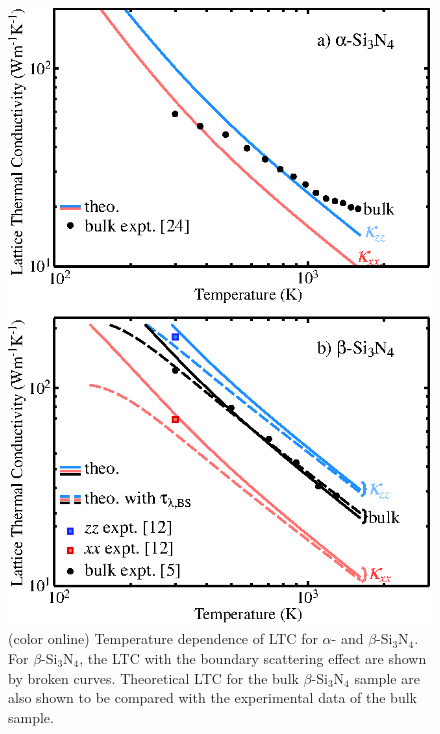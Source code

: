 \documentclass[twocolumn,amsmath,amssymb,a4paper,prb,superscriptaddress,floatfix]{revtex4-1}
\begin{document}
\begin{figure}[ht]
 \begin{center}
  \includegraphics[width=0.90\linewidth]{Fig1_m1010.eps} \caption{(color
  online) Temperature dependence of LTC for $\alpha$-
  and $\beta$-Si$_3$N$_4$. For $\beta$-Si$_3$N$_4$, the LTC with the boundary scattering effect are
  shown by broken curves. Theoretical LTC for
  the bulk $\beta$-Si$_3$N$_4$ sample are also shown to be compared with
  the experimental data of the bulk sample.}
  \label{fig:Fig1_338}
 \end{center}
\end{figure}
\end{document}

